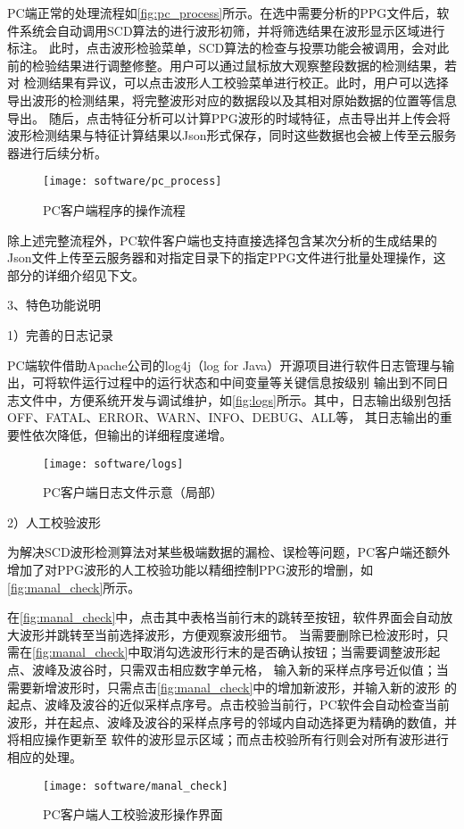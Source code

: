 PC端正常的处理流程如\autoref{fig:pc_process}所示。在选中需要分析的PPG文件后，软件系统会自动调用SCD算法的进行波形初筛，并将筛选结果在波形显示区域进行标注。
此时，点击波形检验菜单，SCD算法的检查与投票功能会被调用，会对此前的检验结果进行调整修整。用户可以通过鼠标放大观察整段数据的检测结果，若对
检测结果有异议，可以点击波形人工校验菜单进行校正。此时，用户可以选择导出波形的检测结果，将完整波形对应的数据段以及其相对原始数据的位置等信息导出。
随后，点击特征分析可以计算PPG波形的时域特征，点击导出并上传会将波形检测结果与特征计算结果以Json形式保存，同时这些数据也会被上传至云服务器进行后续分析。
\begin{figure}[htbp]
    \centering
    \texttt{[image: software/pc\_process]}
    \caption{\label{fig:pc_process}PC客户端程序的操作流程}
\end{figure}

除上述完整流程外，PC软件客户端也支持直接选择包含某次分析的生成结果的Json文件上传至云服务器和对指定目录下的指定PPG文件进行批量处理操作，这部分的详细介绍见下文。

3、特色功能说明

1）完善的日志记录

PC端软件借助Apache公司的log4j（log for Java）开源项目进行软件日志管理与输出，可将软件运行过程中的运行状态和中间变量等关键信息按级别
输出到不同日志文件中，方便系统开发与调试维护，如\autoref{fig:logs}所示。其中，日志输出级别包括OFF、FATAL、ERROR、WARN、INFO、DEBUG、ALL等，
其日志输出的重要性依次降低，但输出的详细程度递增。
\begin{figure}[htbp]
    \centering
    \texttt{[image: software/logs]}
    \caption{\label{fig:logs}PC客户端日志文件示意（局部）}
\end{figure}

2）人工校验波形

为解决SCD波形检测算法对某些极端数据的漏检、误检等问题，PC客户端还额外增加了对PPG波形的人工校验功能以精细控制PPG波形的增删，如\autoref{fig:manal_check}所示。

在\autoref{fig:manal_check}中，点击其中表格当前行末的跳转至按钮，软件界面会自动放大波形并跳转至当前选择波形，方便观察波形细节。
当需要删除已检波形时，只需在\autoref{fig:manal_check}中取消勾选波形行末的是否确认按钮；当需要调整波形起点、波峰及波谷时，只需双击相应数字单元格，
输入新的采样点序号近似值；当需要新增波形时，只需点击\autoref{fig:manal_check}中的增加新波形，并输入新的波形
的起点、波峰及波谷的近似采样点序号。点击校验当前行，PC软件会自动检查当前波形，并在起点、波峰及波谷的采样点序号的邻域内自动选择更为精确的数值，并将相应操作更新至
软件的波形显示区域；而点击校验所有行则会对所有波形进行相应的处理。
\begin{figure}[htbp]
    \centering
    \texttt{[image: software/manal\_check]}
    \caption{\label{fig:manal_check}PC客户端人工校验波形操作界面}
\end{figure}

